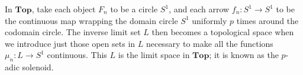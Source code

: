 In $\mathbf{Top}$, take each object $F_n$ to be a circle $S^1$, and each arrow $f_n : S^1 \rightarrow S^1$ to be the continuous map wrapping the domain circle $S^1$ uniformly $p$ times around the codomain circle. The inverse limit set $L$ then becomes a topological space when we introduce just those open sets in $L$ necessary to make all the functions $\mu_n : L \rightarrow S^1$ continuous. This $L$ is the limit space in $\mathbf{Top}$; it is known as the $p$-adic solenoid.
